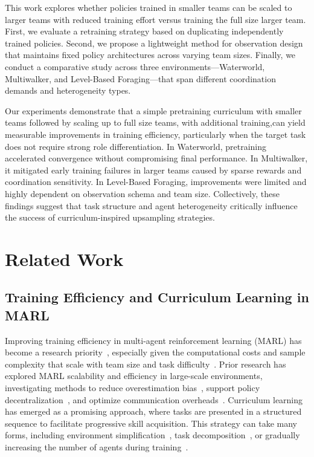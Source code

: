 \documentclass{article}
\begin{document}
This work explores whether policies trained in smaller teams can be scaled to larger teams 
with reduced training effort versus training the full size larger team. First, 
we evaluate a retraining strategy based on duplicating independently trained policies. 
Second, we propose a lightweight method for observation design that maintains fixed policy 
architectures across varying team sizes. Finally, we conduct a comparative study across 
three environments—Waterworld, Multiwalker, and Level-Based Foraging—that span different 
coordination demands and heterogeneity types.

Our experiments demonstrate that a simple pretraining curriculum with smaller teams followed by 
scaling up to full size teams, with additional training,can yield measurable improvements in 
training efficiency, particularly when the target task does not require strong role 
differentiation. 
In Waterworld, pretraining accelerated convergence without compromising final performance. 
In Multiwalker, it mitigated early training failures in larger teams caused by sparse 
rewards and coordination sensitivity. 
In Level-Based Foraging, improvements were limited and highly dependent on 
observation schema and team size. 
Collectively, these findings suggest that task structure and agent heterogeneity 
critically influence the success of curriculum-inspired upsampling strategies.

\section{Related Work}
\subsection{Training Efficiency and Curriculum Learning in MARL}

Improving training efficiency in multi-agent reinforcement learning (MARL) has become a research 
priority~\cite{canese2021,krouka2022}, especially given the computational costs and sample 
complexity that scale with team size and task difficulty~\cite{shoham2007,busoniu2008}. 
Prior research has explored MARL scalability and efficiency in large-scale environments, 
investigating methods to reduce overestimation bias~\cite{ackermann2019}, support policy 
decentralization~\cite{foerster2017,lowe2020}, and optimize communication 
overheads~\cite{sukhbaatar2016,wei2022}. Curriculum learning has emerged as a promising approach, 
where tasks are presented in a structured sequence to facilitate progressive skill acquisition. 
This strategy can take many forms, including environment simplification~\cite{shukla2022}, 
task decomposition~\cite{shi2023}, or gradually increasing the number of agents 
during training~\cite{smit2023, albrecht2024}.
\end{document}
